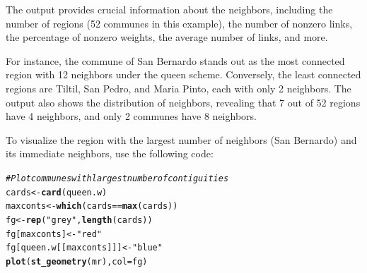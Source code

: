 \documentclass[english,12pt]{book}\usepackage[]{graphicx}\usepackage[]{xcolor}
\makeatletter
\newcommand{\hlstr}[1]{\textcolor[rgb]{0.192,0.494,0.8}{#1}}%
\newcommand{\hlcom}[1]{\textcolor[rgb]{0.678,0.584,0.686}{\textit{#1}}}%
\newcommand{\hlopt}[1]{\textcolor[rgb]{0,0,0}{#1}}%
\newcommand{\hlstd}[1]{\textcolor[rgb]{0.345,0.345,0.345}{#1}}%
\newcommand{\hlkwb}[1]{\textcolor[rgb]{0.69,0.353,0.396}{#1}}%
\newcommand{\hlkwc}[1]{\textcolor[rgb]{0.333,0.667,0.333}{#1}}%
\newcommand{\hlkwd}[1]{\textcolor[rgb]{0.737,0.353,0.396}{\textbf{#1}}}%
\newenvironment{kframe}{%
 \def\at@end@of@kframe{}%
 \ifinner\ifhmode%
  \def\at@end@of@kframe{\end{minipage}}%
  \begin{minipage}{\columnwidth}%
 \fi\fi%
 \def\FrameCommand##1{\hskip\@totalleftmargin \hskip-\fboxsep
 \colorbox{shadecolor}{##1}\hskip-\fboxsep
     \hskip-\linewidth \hskip-\@totalleftmargin \hskip\columnwidth}%
 \MakeFramed {\advance\hsize-\width
   \@totalleftmargin\z@ \linewidth\hsize
   \@setminipage}}%
 {\par\unskip\endMakeFramed%
 \at@end@of@kframe}
\newenvironment{knitrout}{}{} %
\makeatother
\begin{document}
The output provides crucial information about the neighbors, including the number of regions (52 communes in this example), the number of nonzero links, the percentage of nonzero weights, the average number of links, and more.

For instance, the commune of San Bernardo stands out as the most connected region with 12 neighbors under the queen scheme. Conversely, the least connected regions are Tiltil, San Pedro, and Maria Pinto, each with only 2 neighbors. The output also shows the distribution of neighbors, revealing that 7 out of 52 regions have 4 neighbors, and only 2 communes have 8 neighbors.

To visualize the region with the largest number of neighbors (San Bernardo) and its immediate neighbors, use the following code:
\begin{knitrout}
\color{fgcolor}\begin{kframe}
\begin{alltt}
\hlcom{# Plot communes with largest number of contiguities}
\hlstd{cards} \hlkwb{<-} \hlkwd{card}\hlstd{(queen.w)}
\hlstd{maxconts} \hlkwb{<-} \hlkwd{which}\hlstd{(cards} \hlopt{==} \hlkwd{max}\hlstd{(cards))}
\hlstd{fg} \hlkwb{<-} \hlkwd{rep}\hlstd{(}\hlstr{"grey"}\hlstd{,} \hlkwd{length}\hlstd{(cards))}
\hlstd{fg[maxconts]} \hlkwb{<-} \hlstr{"red"}
\hlstd{fg[queen.w[[maxconts]]]} \hlkwb{<-} \hlstr{"blue"}
\hlkwd{plot}\hlstd{(}\hlkwd{st_geometry}\hlstd{(mr),} \hlkwc{col} \hlstd{= fg)}
\end{alltt}
\end{kframe}
\end{knitrout}
\end{document}
